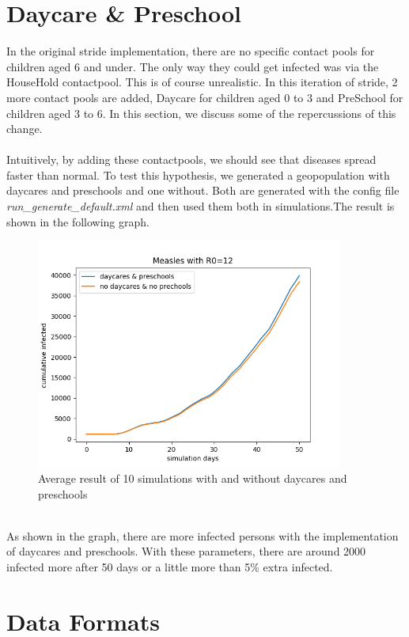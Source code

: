 \documentclass[runningheads]{llncs}
\begin{document}
	\section{Daycare \& Preschool}
		In the original stride implementation, there are no specific contact pools for children aged 6 and under. The only way they could get infected was via the HouseHold contactpool. This is of course unrealistic. In this iteration of stride, 2 more contact pools are added, Daycare for children aged 0 to 3 and PreSchool for children aged 3 to 6. In this section, we discuss some of the repercussions of this change. \\ 
	\\
	Intuitively, by adding these contactpools, we should see that diseases spread faster than normal. To test this hypothesis, we generated a geopopulation with daycares and preschools and one without. Both are generated with the config file \textit{run\_generate\_default.xml} and then used them both in simulations.The result is shown in the following graph.
	\begin{figure}
			\centering
		\includegraphics[width=0.9\textwidth]{measles_r12_daycare_comparison.png}	
		\caption{Average result of 10 simulations with and without daycares and preschools}
		\label{fig0}
	\end{figure}
	\\
	As shown in the graph, there are more infected persons with the implementation of daycares and preschools. With these parameters, there are around 2000 infected more after 50 days or a little more than 5\% extra infected.
	\section{Data Formats}
\end{document}
